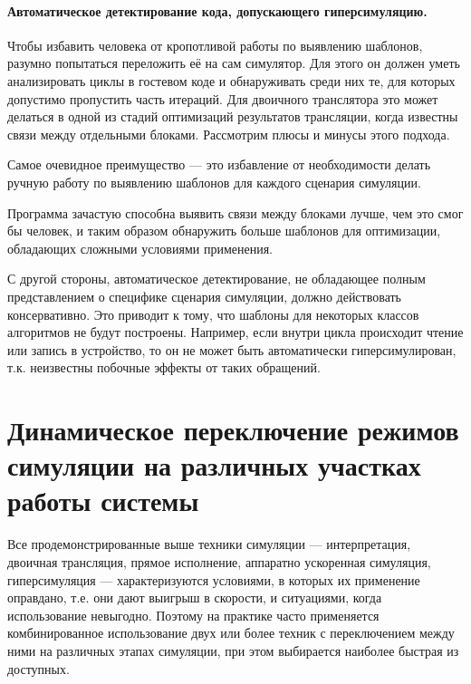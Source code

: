 \paragraph{Автоматическое детектирование кода, допускающего гиперсимуляцию.} Чтобы избавить человека от кропотливой работы по выявлению шаблонов, разумно попытаться переложить её на сам симулятор. Для этого он должен уметь анализировать циклы в гостевом коде и обнаруживать среди них те, для которых допустимо пропустить часть итераций. Для двоичного транслятора это может делаться в одной из стадий оптимизаций результатов трансляции, когда известны связи между отдельными блоками. Рассмотрим плюсы и минусы этого подхода.

\begin{itemize*}
    \item Самое очевидное преимущество --- это избавление от необходимости делать ручную работу по выявлению шаблонов для каждого сценария симуляции.
    \item Программа зачастую способна выявить связи между блоками лучше, чем это смог бы человек, и таким образом обнаружить больше шаблонов для оптимизации, обладающих сложными условиями применения.
    \item С другой стороны, автоматическое детектирование, не обладающее полным представлением о специфике сценария симуляции, должно действовать консервативно. Это приводит к тому, что шаблоны для некоторых классов алгоритмов не будут построены. Например, если внутри цикла происходит чтение или запись в устройство, то он не может быть автоматически гиперсимулирован, т.к. неизвестны побочные эффекты от таких обращений.
\end{itemize*}

\section[Динамическое  переключение режимов симуляции]{Динамическое  переключение режимов симуляции на различных участках работы системы}

Все продемонстрированные выше техники симуляции --- интерпретация, двоичная трансляция, прямое исполнение, аппаратно ускоренная симуляция, гиперсимуляция ---  характеризуются условиями, в которых их применение оправдано, т.е. они дают выигрыш в скорости, и ситуациями, когда использование невыгодно. Поэтому на практике часто применяется комбинированное использование двух или более техник с переключением между ними на различных этапах симуляции, при этом выбирается наиболее быстрая из доступных. 

